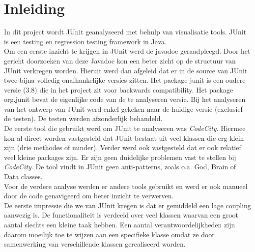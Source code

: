 \documentclass[i1]{oss}
\begin{document}

\maketitlepage
\newpage
\tableofcontents
\pagebreak

\section*{Inleiding}


In dit project wordt JUnit geanalyseerd met behulp van visualisatie tools. JUnit is een testing en regression testing framework in Java.\\


Om een eerste inzicht te krijgen in JUnit werd de javadoc geraadpleegd. Door het gericht doorzoeken van deze Javadoc kon een beter zicht op de structuur van JUnit verkregen worden. Hieruit werd dan afgeleid dat er in de source van JUnit twee bijna volledig onafhankelijke versies zitten. Het package junit is een oudere versie (3.8) die in het project zit voor backwards compatibility. Het package org.junit bevat de eigenlijke code van de te analyseren versie. Bij het analyseren van het ontwerp van JUnit werd enkel gekeken naar de huidige versie (exclusief de testen). De testen werden afzonderlijk behandeld.\\

De eerste tool die gebruikt werd om JUnit te analyseren was \emph{CodeCity}. Hiermee kon al direct worden vastgesteld dat JUnit bestaat uit veel klassen die erg klein zijn (drie methodes of minder). Verder werd ook vastgesteld dat er ook relatief veel kleine packages zijn. Er zijn geen duidelijke problemen vast te stellen bij \emph{CodeCity}. De tool vindt in JUnit geen anti-patterns, zoals o.a. God, Brain of Data classes. \\

Voor de verdere analyse werden er andere tools gebruikt en werd er ook manueel door de code genavigeerd om beter inzicht te verwerven. \\

De eerste impressie die we van JUnit kregen is dat er gemiddeld een lage coupling aanwezig is. De functionaliteit is verdeeld over veel klassen waarvan een groot aantal slechts een kleine taak hebben. Een aantal verantwoordelijkheden zijn daarom moeilijk toe te wijzen aan een specifieke klasse omdat ze door samenwerking van verschillende klassen gerealiseerd worden.\\
\end{document}

